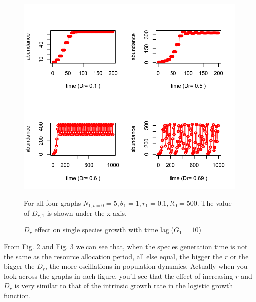 \documentclass[12pt]{article}
\begin{document}
\begin{figure}
 \includegraphics[width=\textwidth]{1sp_sojourn_Dreffect.pdf}
 \caption{$D_r$ effect on single species growth with time lag ($G_1=10$)}
For all four graphs $ N_{1,t=0}=5, \theta_1=1, r_1= 0.1, R_0=500$. The value of $D_{r,1}$ is shown under the x-axis.
\end{figure}

From Fig. 2 and Fig. 3 we can see that, when the species generation time is not the same as the resource allocation period, all else equal, the bigger the $r$ or the bigger the $D_r$, the more oscillations in population dynamics. Actually when you look across the graphs in each figure, you'll see that the effect of increasing $r$ and $D_r$ is very similar to that of the intrinsic growth rate in the logistic growth function. 
\end{document}
